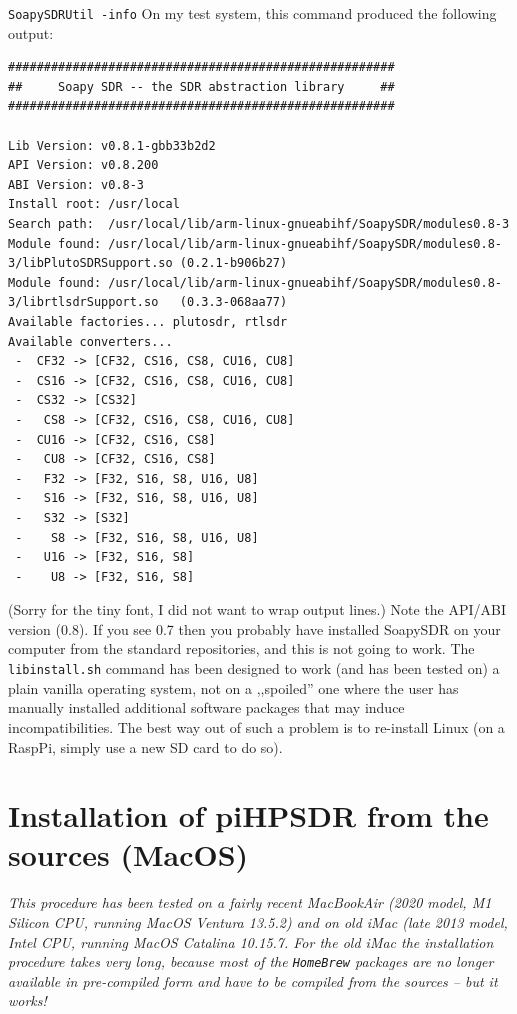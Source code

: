 \documentclass[12pt]{book}
\def\grtt#1{\texttt{\color{magenta}#1}}
\begin{document}
\grtt{SoapySDRUtil -info}
\clearpage
On my test system, this command produced the following output:
\begin{tiny}
\begin{verbatim}
######################################################
##     Soapy SDR -- the SDR abstraction library     ##
######################################################

Lib Version: v0.8.1-gbb33b2d2
API Version: v0.8.200
ABI Version: v0.8-3
Install root: /usr/local
Search path:  /usr/local/lib/arm-linux-gnueabihf/SoapySDR/modules0.8-3
Module found: /usr/local/lib/arm-linux-gnueabihf/SoapySDR/modules0.8-3/libPlutoSDRSupport.so (0.2.1-b906b27)
Module found: /usr/local/lib/arm-linux-gnueabihf/SoapySDR/modules0.8-3/librtlsdrSupport.so   (0.3.3-068aa77)
Available factories... plutosdr, rtlsdr
Available converters...
 -  CF32 -> [CF32, CS16, CS8, CU16, CU8]
 -  CS16 -> [CF32, CS16, CS8, CU16, CU8]
 -  CS32 -> [CS32]
 -   CS8 -> [CF32, CS16, CS8, CU16, CU8]
 -  CU16 -> [CF32, CS16, CS8]
 -   CU8 -> [CF32, CS16, CS8]
 -   F32 -> [F32, S16, S8, U16, U8]
 -   S16 -> [F32, S16, S8, U16, U8]
 -   S32 -> [S32]
 -    S8 -> [F32, S16, S8, U16, U8]
 -   U16 -> [F32, S16, S8]
 -    U8 -> [F32, S16, S8]
\end{verbatim}
\end{tiny}

(Sorry for the tiny font, I did not want to wrap output lines.)
Note the API/ABI version (0.8). If you see 0.7 then you probably have installed SoapySDR on your computer
from
the standard repositories, and this is not going to work. The \texttt{libinstall.sh} command  has been
designed
to work (and has been tested on) a plain vanilla operating system, not on a ,,spoiled'' one
where the user has manually installed additional software packages that may induce incompatibilities.
The best way out of such a problem is to re-install Linux (on a RaspPi, simply use a new SD card to do so).

\chapter[MacOS: piHPDSR install from sources]{Installation of piHPSDR from the sources (MacOS)}
\label{sec:installmacosx}

\textit{This procedure has been tested on a  fairly recent MacBookAir (2020 model, M1 Silicon CPU, running
MacOS
Ventura 13.5.2) and on old iMac (late 2013 model, Intel CPU, running MacOS Catalina 10.15.7.
For the old iMac the installation procedure takes very long, because most of the \texttt{HomeBrew} packages
are no longer available in pre-compiled form and have to be compiled from the sources -- but it works!}
\end{document}
